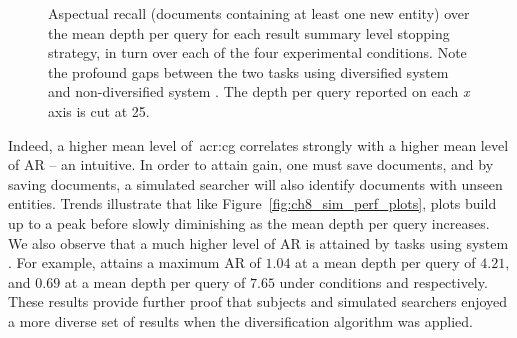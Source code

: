 \begin{figure}[p!]
    \centering
    \caption[AR \emph{what-if} performance plots]{Aspectual recall (documents containing at least one new entity) over the mean depth per query for each result summary level stopping strategy, in turn over each of the four experimental conditions. Note the profound gaps between the two tasks using diversified system  and non-diversified system . The depth per query reported on each \emph{x} axis is cut at 25.}
    \label{fig:ch8_sim_ar_plots}
\end{figure}

Indeed, a higher mean level of~\gls{acr:cg} correlates strongly with a higher mean level of AR -- an intuitive. In order to attain gain, one must save documents, and by saving documents, a simulated searcher will also identify documents with unseen entities. Trends illustrate that like Figure~\ref{fig:ch8_sim_perf_plots}, plots build up to a peak before slowly diminishing as the mean depth per query increases. We also observe that a much higher level of AR is attained by tasks using system . For example,  attains a maximum AR of $1.04$ at a mean depth per query of $4.21$, and $0.69$ at a mean depth per query of $7.65$ under conditions  and  respectively. These results provide further proof that subjects and simulated searchers enjoyed a more diverse set of results when the diversification algorithm was applied.

